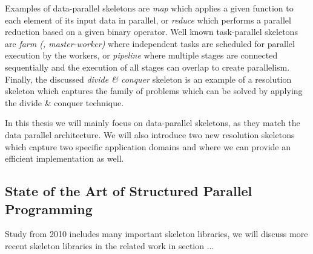 Examples of data-parallel skeletons are \emph{map} which applies a given function to each element of its input data in parallel, or \emph{reduce} which performs a parallel reduction based on a given binary operator.
Well known task-parallel skeletons are \emph{farm (\aka, master-worker)} where independent tasks are scheduled for parallel execution by the workers, or \emph{pipeline} where multiple stages are connected sequentially and the execution of all stages can overlap to create parallelism.
Finally, the discussed \emph{divide \& conquer} skeleton is an example of a resolution skeleton which captures the family of problems which can be solved by applying the divide \& conquer technique.

In this thesis we will mainly focus on data-parallel skeletons, as they match the data parallel \GPU architecture.
We will also introduce two new resolution skeletons which capture two specific application domains and where we can provide an efficient \GPU implementation as well.

\subsection{State of the Art of Structured Parallel Programming}



  Study from 2010 includes many important skeleton libraries, we will discuss more recent skeleton libraries in the related work in section ...



